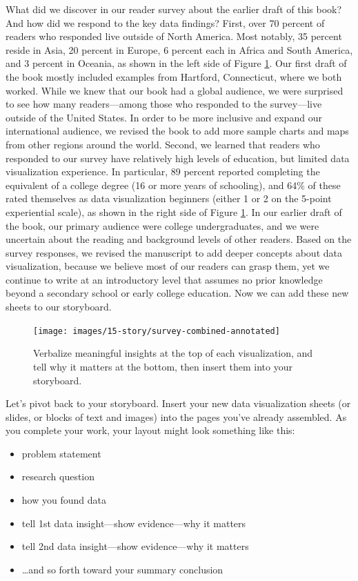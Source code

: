 \documentclass[
  english,
]{book}
\providecommand{\tightlist}{%
  \setlength{\itemsep}{0pt}\setlength{\parskip}{0pt}}
\begin{document}
What did we discover in our reader survey about the earlier draft of this book? And how did we respond to the key data findings? First, over 70 percent of readers who responded live outside of North America. Most notably, 35 percent reside in Asia, 20 percent in Europe, 6 percent each in Africa and South America, and 3 percent in Oceania, as shown in the left side of Figure \ref{fig:survey-combined-annotated}. Our first draft of the book mostly included examples from Hartford, Connecticut, where we both worked. While we knew that our book had a global audience, we were surprised to see how many readers---among those who responded to the survey---live outside of the United States. In order to be more inclusive and expand our international audience, we revised the book to add more sample charts and maps from other regions around the world. Second, we learned that readers who responded to our survey have relatively high levels of education, but limited data visualization experience. In particular, 89 percent reported completing the equivalent of a college degree (16 or more years of schooling), and 64\% of these rated themselves as data visualization beginners (either 1 or 2 on the 5-point experiential scale), as shown in the right side of Figure \ref{fig:survey-combined-annotated}. In our earlier draft of the book, our primary audience were college undergraduates, and we were uncertain about the reading and background levels of other readers. Based on the survey responses, we revised the manuscript to add deeper concepts about data visualization, because we believe most of our readers can grasp them, yet we continue to write at an introductory level that assumes no prior knowledge beyond a secondary school or early college education. Now we can add these new sheets to our storyboard.



\begin{figure}
\texttt{[image: images/15-story/survey-combined-annotated]} \caption{Verbalize meaningful insights at the top of each visualization, and tell why it matters at the bottom, then insert them into your storyboard.}\label{fig:survey-combined-annotated}
\end{figure}

Let's pivot back to your storyboard. Insert your new data visualization sheets (or slides, or blocks of text and images) into the pages you've already assembled. As you complete your work, your layout might look something like this:

\begin{itemize}
\tightlist
\item
  problem statement
\item
  research question
\item
  how you found data
\item
  tell 1st data insight---show evidence---why it matters
\item
  tell 2nd data insight---show evidence---why it matters
\item
  \ldots and so forth toward your summary conclusion
\end{itemize}
\end{document}
